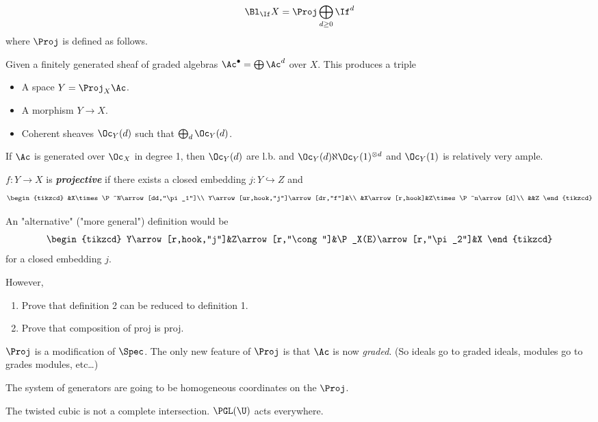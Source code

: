 \begin{defn}
	\[\Bl_{\If}X=\Proj\bigoplus_{d\geq0}\If^d\]
	where $\Proj$ is defined as follows.
\end{defn}
\begin{defn}[1]
	Given a finitely generated sheaf of graded algebras $\Ac^\bullet=\bigoplus\Ac^d$ over $X$. This produces a triple
	\begin{itemize}
		\item A space $Y=\Proj_X\Ac$.
		\item A morphism $Y\to X$.
		\item Coherent sheaves $\Oc_Y(d)$ such that $\bigoplus_d\Oc_Y(d)$.
	\end{itemize}
	If $\Ac$ is generated over $\Oc_X$ in degree 1, then $\Oc_Y(d)$ are l.b. and $\Oc_Y(d)\aleph\Oc_Y(1)^{\otimes d}$ and $\Oc_Y(1)$ is relatively very ample.
	
	$f:Y\to X$ is \textbf{\textit{projective}} if there exists a closed embedding $j:Y\hookrightarrow Z$ and
	\[\begin{tikzcd}
		&X\times\P^N\arrow[dd,"\pi_1"]\\
		Y\arrow[ur,hook,"j"]\arrow[dr,"f"]&\\
		&X\arrow[r,hook]&Z\times \P^n\arrow[d]\\
		&&Z
	\end{tikzcd}\]
\end{defn}
\begin{defn}[2]
	An "alternative" ("more general") definition would be
	\[\begin{tikzcd}
		Y\arrow[r,hook,"j"]&Z\arrow[r,"\cong"]&\P_X(E)\arrow[r,"\pi_2"]&X
	\end{tikzcd}\]
	for a closed embedding $j$.
\end{defn}
However,
\begin{exercise}\leavevmode
	\begin{enumerate}
		\item Prove that definition 2 can be reduced to definition 1.
		\item Prove that composition of proj is proj.
	\end{enumerate}
\end{exercise}
\begin{remark}
	$\Proj$ is a modification of $\Spec$. The only new feature of $\Proj$ is that $\Ac$ is now \textit{graded}. (So ideals go to graded ideals, modules go to grades modules, etc…)
\end{remark}
The system of generators are going to be homogeneous coordinates on the $\Proj$.
\begin{example}
	The twisted cubic is not a complete intersection. $\PGL(\U)$ acts everywhere.
\end{example}
